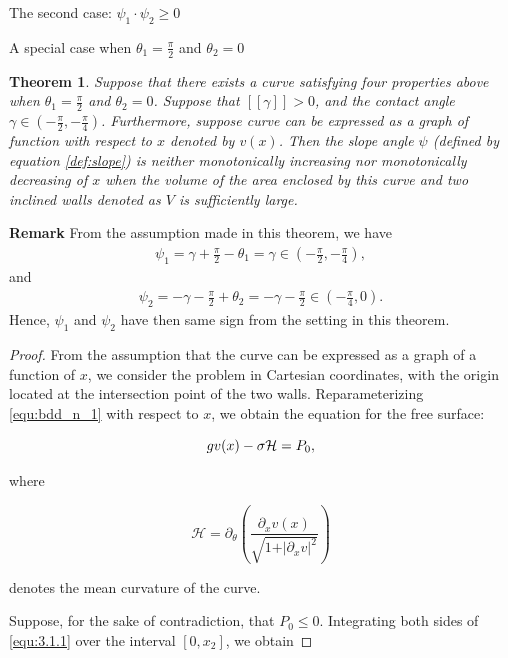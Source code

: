 \documentclass[letterpaper,reqno,10pt,twoside]{amsart}
\newtheorem{theorem}{Theorem}[section]
\theoremstyle{definition}
\theoremstyle{remark}
\begin{document}
\begin{section}{The second case: $\psi_1\cdot \psi_2\geq 0$ }
\begin{subsection}{A special case when $\theta_1=\frac{\pi}{2}$ and $\theta_2=0$}
    \begin{theorem}
    
    Suppose that there exists a curve satisfying four properties above when $\theta_1=\frac{\pi}{2}$ and $\theta_2=0$. Suppose that  $[\![\gamma]\!]>0$, and the contact angle $\gamma\in(-\frac{\pi}{2},-\frac{\pi}{4})$. Furthermore, suppose curve can be expressed as a graph of function with respect to $x$ denoted by $v(x)$. Then the slope angle $\psi$ (defined by equation \eqref{def:slope}) is neither monotonically increasing nor monotonically decreasing of $x$ when the volume of the area enclosed by this curve and two inclined walls denoted as $V$ is sufficiently large.
     
    \end{theorem}

    \textbf{Remark} From the assumption made in this theorem, we have
    \begin{align}
        \psi_{1}=\gamma+\frac{\pi}{2}-\theta_{1}=\gamma\in (-\frac{\pi}{2},-\frac{\pi}{4}),
    \end{align}
    and
    \begin{align}
        \psi_{2}=-\gamma-\frac{\pi}{2}+\theta_{2}=-\gamma-\frac{\pi}{2}\in(-\frac{\pi}{4},0).
    \end{align}
    \noindent Hence, $\psi_{1}$ and $\psi_{2}$ have then same sign from the setting in this theorem.
    \begin{proof}
    
     From the assumption that the curve can be expressed as a graph of a function of $x$, we consider the problem in Cartesian coordinates, with the origin located at the intersection point of the two walls.  Reparameterizing \eqref{equ:bdd_n_1} with respect to $x$, we obtain the equation for the free surface:

     \begin{equation}{\label{equ:3.1.1}}
         gv(x)-\sigma \mathcal{H}=P_{0},
     \end{equation}

     \noindent where

     \begin{equation*}
         \mathcal{H}=\partial_{\theta}(\frac{\partial_{x}v(x)}{\sqrt{1+\vert \partial_{x}v\vert^{2}}})
     \end{equation*}

     \noindent denotes the mean curvature of the curve.
     
     Suppose, for the sake of contradiction, that $P_{0}\le 0$. Integrating both sides of \eqref{equ:3.1.1} over the interval $[0,x_2]$, we obtain


\end{proof}
\end{subsection}
\end{section}
\end{document}
